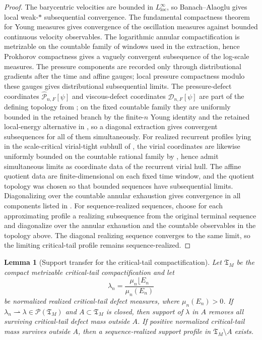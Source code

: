 \documentclass[11pt]{amsart}
\numberwithin{equation}{section}
\theoremstyle{plain}
\newtheorem{lemma}[lemma]{Lemma}
\theoremstyle{definition}
\theoremstyle{remark}
\newcommand{\loc}{\mathrm{loc}}
\newcommand{\Tcrit}{\mathfrak T_M}
\begin{document}
\begin{proof}
The barycentric velocities are bounded in \(L^\infty_{\loc}\), so
Banach--Alaoglu gives local weak-\(*\) subsequential convergence.  The
fundamental compactness theorem for Young measures gives convergence of the
oscillation measures against bounded continuous velocity observables.  The
logarithmic annular compactification is metrizable on the countable family of
windows used in the extraction, hence Prokhorov compactness gives a vaguely
convergent subsequence of the log-scale measures.  The pressure components are
recorded only through distributional gradients after the time and affine gauges;
local pressure compactness modulo these gauges gives distributional
subsequential limits.  The pressure-defect coordinates
\(\widehat{\mathscr P}_{n,F}[\psi]\) and viscous-defect coordinates
\(\mathscr D_{n,F}[\psi]\) are part of the defining topology from
;
on the fixed countable family they are uniformly bounded in the retained branch
by the finite-\(n\) Young identity and the retained local-energy alternative in
, so a diagonal extraction gives convergent
subsequences for all of them simultaneously.  For realized recurrent
profiles lying in the scale-critical virial-tight subhull of
, the virial coordinates are
likewise uniformly bounded on the countable rational family by
, hence admit simultaneous
limits as coordinate data of the recurrent virial hull.  The affine quotient data
are finite-dimensional on each fixed time window, and the quotient topology was
chosen so that bounded sequences have subsequential limits.  Diagonalizing over
the countable annular exhaustion gives convergence in all components listed in
.  For sequence-realized sequences,
choose for each approximating profile a realizing subsequence from the original
terminal sequence and diagonalize over the annular exhaustion and the countable
observables in the topology above.  The diagonal realizing sequence converges
to the same limit, so the limiting critical-tail profile remains
sequence-realized.
\end{proof}

\begin{lemma}[Support transfer for the critical-tail compactification]
\label{lem:critical-tail-support-transfer}
Let \(\Tcrit\) be the compact metrizable critical-tail compactification and let
\[
   \lambda_n=\frac{\mu_n\lfloor E_n}{\mu_n(E_n)}
\]
be normalized realized critical-tail defect measures, where \(\mu_n(E_n)>0\).
If \(\lambda_n\rightharpoonup\lambda\in\mathcal P(\Tcrit)\) and
\(A\subset\Tcrit\) is closed, then support of \(\lambda\) in \(A\) removes all
surviving critical-tail defect mass outside \(A\).  If positive normalized
critical-tail mass survives outside \(A\), then a sequence-realized support
profile in \(\Tcrit\setminus A\) exists.
\end{lemma}
\end{document}
